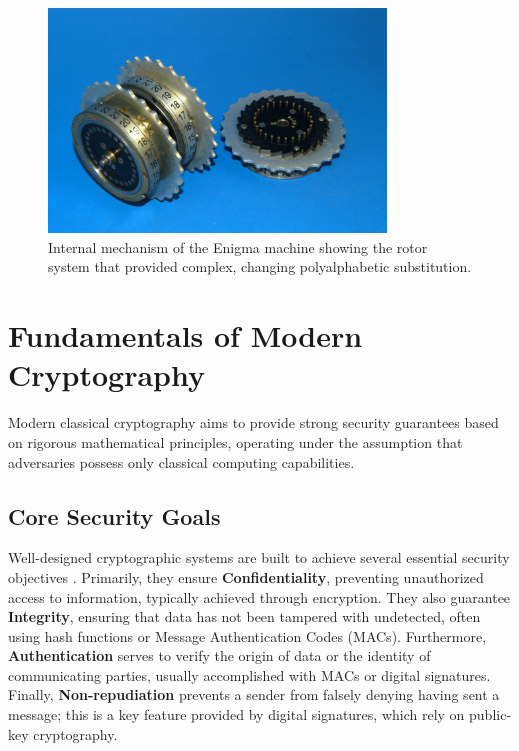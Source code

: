 \begin{figure}[ht]
    \centering
    \includegraphics[width=0.8\textwidth]{03_Classical_Cryptography/enigma_rotors}
    \caption{Internal mechanism of the Enigma machine showing the rotor system that provided complex, changing polyalphabetic substitution.}
    \label{fig:enigma_rotors_ch3}
\end{figure}

\section{Fundamentals of Modern Cryptography}\label{sec:crypto_fundamentals_ch3}

Modern classical cryptography aims to provide strong security guarantees based on rigorous mathematical principles, operating under the assumption that adversaries possess only classical computing capabilities.

\subsection{Core Security Goals}
Well-designed cryptographic systems are built to achieve several essential security objectives \parencite{katz2014introduction, stallings2017cryptography}. Primarily, they ensure \textbf{Confidentiality}, preventing unauthorized access to information, typically achieved through encryption. They also guarantee \textbf{Integrity}, ensuring that data has not been tampered with undetected, often using hash functions or Message Authentication Codes (MACs). Furthermore, \textbf{Authentication} serves to verify the origin of data or the identity of communicating parties, usually accomplished with MACs or digital signatures. Finally, \textbf{Non-repudiation} prevents a sender from falsely denying having sent a message; this is a key feature provided by digital signatures, which rely on public-key cryptography.

